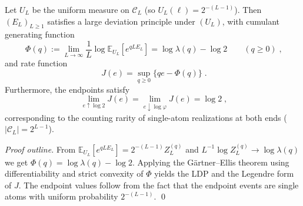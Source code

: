 \begin{theorem}\label{thm:pom-multiplicity-energy-ldp-uniform}
Let \(U_L\) be the uniform measure on \(\mathcal{C}_L\) (so \(U_L(\boldsymbol{\ell})=2^{-(L-1)}\)).
Then \((E_L)_{L\ge 1}\) satisfies a large deviation principle under \((U_L)\), with cumulant generating function
\[
\boxed{\;
\Phi(q):=\lim_{L\to\infty}\frac{1}{L}\log\mathbb{E}_{U_L}\!\left[e^{qLE_L}\right]
=\log\lambda(q)-\log 2\qquad(q\ge 0)\; } ,
\]
and rate function
\[
\boxed{\;
J(e)=\sup_{q\ge 0}\bigl\{q e-\Phi(q)\bigr\}\; } .
\]
Furthermore, the endpoints satisfy
\[
\boxed{\;
\lim_{e\uparrow\log 2}J(e)=\lim_{e\downarrow\log\varphi}J(e)=\log 2\; } ,
\]
corresponding to the counting rarity of single-atom realizations at both ends (\(|\mathcal{C}_L|=2^{L-1}\)).
\end{theorem}
\begin{proof}[Proof outline]
From \(\mathbb{E}_{U_L}[e^{qLE_L}]=2^{-(L-1)}Z_L^{(q)}\) and \(L^{-1}\log Z_L^{(q)}\to\log\lambda(q)\) we get \(\Phi(q)=\log\lambda(q)-\log 2\).
Applying the G\"artner--Ellis theorem using differentiability and strict convexity of \(\Phi\) yields the LDP and the Legendre form of \(J\).
The endpoint values follow from the fact that the endpoint events are single atoms with uniform probability \(2^{-(L-1)}\). \qed
\end{proof}


